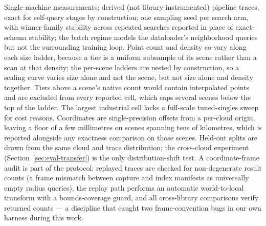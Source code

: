 Single-machine measurements; derived (not library-instrumented) pipeline traces, exact for self-query stages by construction; one sampling seed per search arm, with winner-family stability across repeated searches reported in place of exact-schema stability; the batch regime models the dataloader's neighborhood queries but not the surrounding training loop. Point count and density co-vary along each size ladder, because a tier is a uniform subsample of its scene rather than a scan at that density; the per-scene ladders are nested by construction, so a scaling curve varies size alone and not the scene, but not size alone and density together. Tiers above a scene's native count would contain interpolated points and are excluded from every reported cell, which caps several scenes below the top of the ladder. The largest industrial cell lacks a full-scale tuned-singles sweep for cost reasons. Coordinates are single-precision offsets from a per-cloud origin, leaving a floor of a few millimetres on scenes spanning tens of kilometres, which is reported alongside any exactness comparison on those scenes. Held-out splits are drawn from the same cloud and trace distribution; the cross-cloud experiment (Section~\ref{sec:eval-transfer}) is the only distribution-shift test. A coordinate-frame audit is part of the protocol: replayed traces are checked for non-degenerate result counts (a frame mismatch between capture and index manifests as universally empty radius queries), the replay path performs an automatic world-to-local transform with a bounds-coverage guard, and all cross-library comparisons verify returned counts --- a discipline that caught two frame-convention bugs in our own harness during this work.
